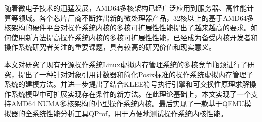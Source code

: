 

\makeatletter
\ifthu@bachelor\relax\else
  \ifthu@doctor
  \else
    \ifthu@master
    \fi
  \fi
\fi
\makeatother





\begin{cabstract}
	随着微电子技术的迅猛发展，AMD64多核架构已经广泛应用到服务器、高性能计算等领域。各个芯片厂商不断推出新的微处理器产品，32核以上的基于AMD64多核架构的硬件平台对操作系统内核的多核可扩展性性能提出了越来越高的要求。如何使用新方法提高操作系统内核的多核可扩展性性能，已经成为备受内核开发者和操作系统研究者关注的重要课题，具有较高的研究价值和现实意义。

	本文对研究了现有开源操作系统Linux虚拟内存管理系统的多核竞争瓶颈进行了研究，提出了一种针对对象引用计数器和简化Posix标准的操作系统虚拟内存管理子系统的建模方法。并进一步提出了结合KLEE符号执行引擎和可交换性原理求解操作系统模型中可扩展实现存在条件的新方法。在此理论基础上，本文实现了一个支持AMD64
	NUMA多核架构的小型操作系统内核。最后实现了一款基于QEMU模拟器的全系统性能分析工具QProf，用于方便地测试操作系统内核性能。

\end{cabstract}

